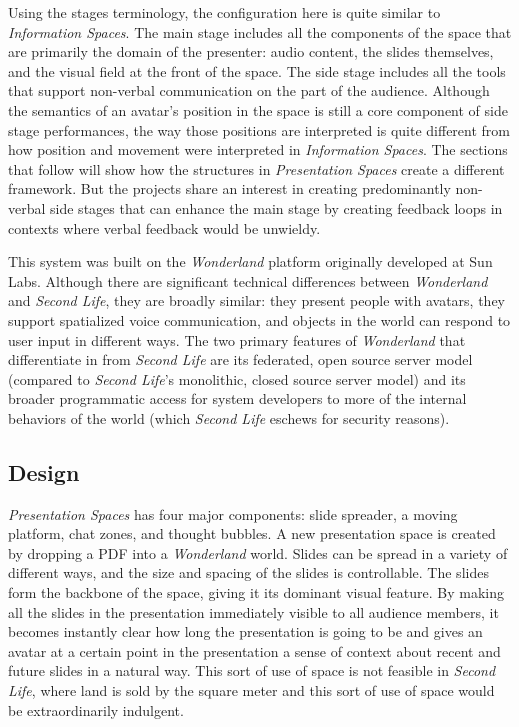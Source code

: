 Using the stages terminology, the configuration here is quite similar to \emph{Information Spaces}. The main stage includes all the components of the space that are primarily the domain of the presenter: audio content, the slides themselves, and the visual field at the front of the space. The side stage includes all the tools that support non-verbal communication on the part of the audience. Although the semantics of an avatar's position in the space is still a core component of side stage performances, the way those positions are interpreted is quite different from how position and movement were interpreted in \emph{Information Spaces}. The sections that follow will show how the structures in \emph{Presentation Spaces} create a different framework. But the projects share an interest in creating predominantly non-verbal side stages that can enhance the main stage by creating feedback loops in contexts where verbal feedback would be unwieldy. 

This system was built on the \emph{Wonderland} platform \citep{Kaplan:2011en} originally developed at Sun Labs. Although there are significant technical differences between \emph{Wonderland} and \emph{Second Life}, they are broadly similar: they present people with avatars, they support spatialized voice communication, and objects in the world can respond to user input in different ways. The two primary features of \emph{Wonderland} that differentiate in from \emph{Second Life} are its federated, open source server model (compared to \emph{Second Life}'s monolithic, closed source server model) and its broader programmatic access for system developers to more of the internal behaviors of the world (which \emph{Second Life} eschews for security reasons). 


\subsection{Design}

\emph{Presentation Spaces} has four major components: slide spreader, a moving platform, chat zones, and thought bubbles. A new presentation space is created by dropping a PDF into a \emph{Wonderland} world. Slides can be spread in a variety of different ways, and the size and spacing of the slides is controllable. The slides form the backbone of the space, giving it its dominant visual feature. By making all the slides in the presentation immediately visible to all audience members, it becomes instantly clear how long the presentation is going to be and gives an avatar at a certain point in the presentation a sense of context about recent and future slides in a natural way. This sort of use of space is not feasible in \emph{Second Life}, where land is sold by the square meter and this sort of use of space would be extraordinarily indulgent. 

